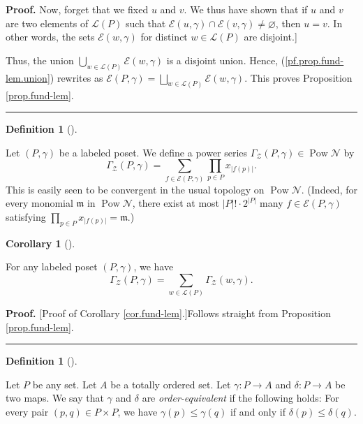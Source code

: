 \documentclass[numbers=enddot,12pt,final,onecolumn,notitlepage]{scrartcl}%
\theoremstyle{definition}
\newtheorem{defi}[theo]{Definition}
\newenvironment{definition}[1][]
{\begin{defi}[#1]\begin{leftbar}}
{\end{leftbar}\end{defi}}
\newtheorem{coro}[theo]{Corollary}
\newenvironment{corollary}[1][]
{\begin{coro}[#1]\begin{leftbar}}
{\end{leftbar}\end{coro}}
\newenvironment{proof}[1][Proof]{\noindent\textbf{#1.} }{\ \rule{0.5em}{0.5em}}
\newenvironment{verlong}{}{}
\let\sumnonlimits\sum
\let\prodnonlimits\prod
\renewcommand{\sum}{\sumnonlimits\limits}
\renewcommand{\prod}{\prodnonlimits\limits}
\begin{document}
\begin{verlong}
\begin{proof}
Now, forget that we fixed $u$ and $v$. We thus have shown that if $u$  and $v$
are two elements of $\mathcal{L}\left(  P\right)  $ such that $\mathcal{E}%
\left(  u,\gamma\right)  \cap\mathcal{E}\left(  v,\gamma\right)
\neq\varnothing$, then $u=v$. In other words, the sets $\mathcal{E}\left(
w,\gamma\right)  $ for distinct $w\in\mathcal{L}\left(  P\right)  $ are disjoint.]

Thus, the union $\bigcup_{w\in\mathcal{L}\left(  P\right)  }\mathcal{E}\left(
w,\gamma\right)  $ is a disjoint union. Hence, (\ref{pf.prop.fund-lem.union})
rewrites as $\mathcal{E}\left(  P,\gamma\right)  =\bigsqcup_{w\in
\mathcal{L}\left(  P\right)  }\mathcal{E}\left(  w,\gamma\right)  $. This
proves Proposition \ref{prop.fund-lem}.
\end{proof}
\end{verlong}

\begin{definition}
\label{def.GammaZ}Let $\left(  P,\gamma\right)  $ be a labeled poset. We
define a power series $\Gamma_{\mathcal{Z}}\left(  P,\gamma\right)
\in\operatorname*{Pow}\mathcal{N}$ by%
\[
\Gamma_{\mathcal{Z}}\left(  P,\gamma\right)  =\sum_{f\in\mathcal{E}\left(
P,\gamma\right)  }\prod_{p\in P}x_{\left\vert f\left(  p\right)  \right\vert
}.
\]
This is easily seen to be convergent in the usual topology on
$\operatorname*{Pow}\mathcal{N}$.
(Indeed, for every monomial $\mathfrak{m}$ in $\operatorname*{Pow}\mathcal{N}$,
there exist at most $\left|P\right|! \cdot 2^{\left|P\right|}$ many
$f \in \mathcal{E} \left(P, \gamma\right)$ satisfying
$\prod_{p\in P}x_{\left\vert f\left(  p\right)  \right\vert } = \mathfrak{m}$.)
\end{definition}

\begin{corollary}
\label{cor.fund-lem}For any labeled poset $\left(  P,\gamma\right)  $, we have%
\[
\Gamma_{\mathcal{Z}}\left(  P,\gamma\right)  =\sum_{w\in\mathcal{L}\left(
P\right)  }\Gamma_{\mathcal{Z}}\left(  w,\gamma\right)  .
\]

\end{corollary}

\begin{proof}
[Proof of Corollary \ref{cor.fund-lem}.]Follows straight from Proposition
\ref{prop.fund-lem}.
\end{proof}

\begin{definition}
Let $P$ be any set. Let $A$ be a totally ordered set. Let $\gamma:P\rightarrow
A$ and $\delta:P\rightarrow A$ be two maps. We say that $\gamma$ and $\delta$
are \textit{order-equivalent} if the following holds: For every pair $\left(
p,q\right)  \in P\times P$, we have $\gamma\left(  p\right)  \leq\gamma\left(
q\right)  $ if and only if $\delta\left(  p\right)  \leq\delta\left(
q\right)  $.
\end{definition}
\end{document}
